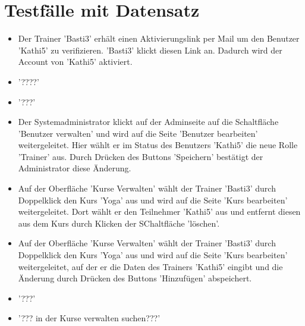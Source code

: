\documentclass[a4paper]{scrreprt}
\newcounter{Lc}
\newcounter{Hc}
\newcommand{\stepHc}{\stepcounter{Hc}\setcounter{Lc}{0}}
\begin{document}
\section{Testfälle mit Datensatz}
			\stepHc
			\begin{itemize}
				\item {}
				Der Trainer 'Basti3' erhält einen Aktivierungslink per Mail um den Benutzer 'Kathi5' zu verifizieren. 'Basti3' klickt diesen Link an. Dadurch wird der Account von 'Kathi5' aktiviert.
				
				\item {}
				'????'
				
				\item {}
				'???'
				
				
				\item {} 
				Der Systemadministrator klickt auf der Adminseite auf die Schaltfläche 'Benutzer verwalten' und wird auf die Seite 'Benutzer bearbeiten' weitergeleitet. Hier wählt er im Status des Benutzers 'Kathi5' die neue Rolle 'Trainer' aus. Durch Drücken des Buttons 'Speichern' bestätigt der Administrator diese Änderung.
				
				\item {}
				Auf der Oberfläche 'Kurse Verwalten' wählt der Trainer 'Basti3' durch Doppelklick den Kurs 'Yoga' aus und wird auf die Seite 'Kurs bearbeiten' weitergeleitet. Dort wählt er den Teilnehmer 'Kathi5' aus und entfernt diesen aus dem Kurs durch Klicken der SChaltfläche 'löschen'.
				
				\item {}
				Auf der Oberfläche 'Kurse Verwalten' wählt der Trainer 'Basti3' durch Doppelklick den Kurs 'Yoga' aus und wird auf die Seite 'Kurs bearbeiten' weitergeleitet, auf der er die Daten des Trainers 'Kathi5' eingibt und die Änderung durch Drücken des Buttons 'Hinzufügen' abspeichert. 
				
				\item {}
				'???'
				
				\item {}
				'??? in der Kurse verwalten suchen???'
				

\end{itemize}
\end{document}
